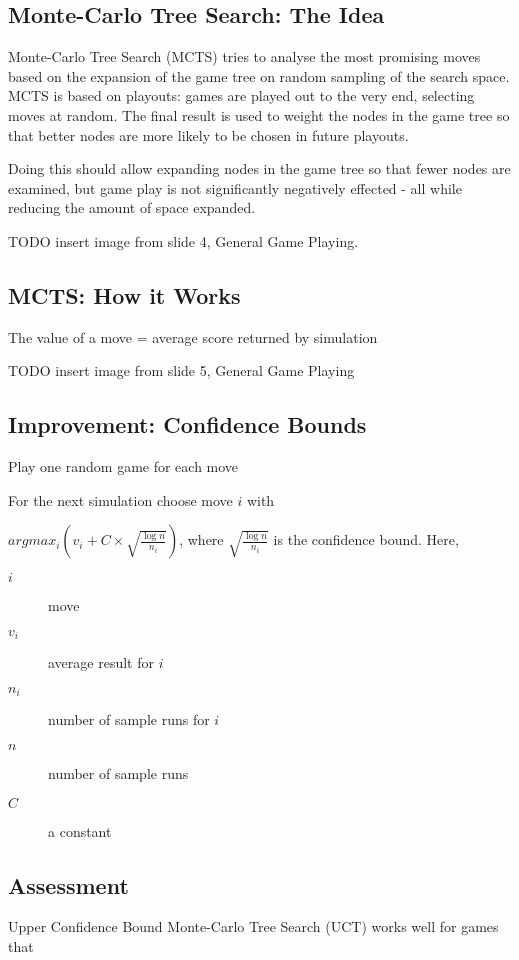 \subsection{Monte-Carlo Tree Search: The Idea}
Monte-Carlo Tree Search (MCTS) tries to analyse the most promising moves based
on the expansion of the game tree on random sampling of the search space. MCTS
is based on playouts: games are played out to the very end, selecting moves at
random. The final result is used to weight the nodes in the game tree so that
better nodes are more likely to be chosen in future playouts.

Doing this should allow expanding nodes in the game tree so that fewer nodes
are examined, but game play is not significantly negatively effected - all
while reducing the amount of space expanded.

TODO insert image from slide 4, General Game Playing.

\subsection{MCTS: How it Works}
The value of a move = average score returned by simulation

TODO insert image from slide 5, General Game Playing

\subsection{Improvement: Confidence Bounds}
Play one random game for each move

For the next simulation choose move $i$ with

$argmax_i (v_i + C \times \sqrt{\frac{\log n}{n_i}})$, where $\sqrt{\frac{\log
n}{n_i}}$ is the confidence bound.
Here,
\begin{description}
    \item[$i$] move
    \item[$v_i$] average result for $i$
    \item[$n_i$] number of sample runs for $i$
    \item[$n$] number of sample runs
    \item[$C$] a constant
\end{description}

\subsection{Assessment}
Upper Confidence Bound Monte-Carlo Tree Search (UCT) works well for games that

